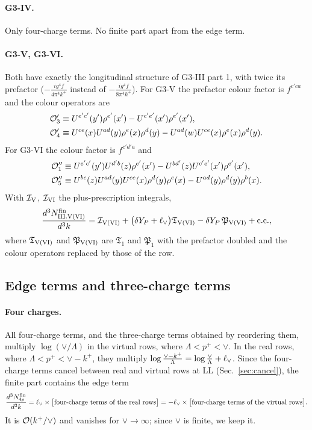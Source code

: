 \paragraph*{G3-IV.} Only four-charge terms. No finite part apart from the edge term.

\paragraph*{G3-V, G3-VI.} Both have exactly the longitudinal structure of G3-III part 1, with twice its prefactor ($-\frac{ig^4f}{4\pi^4k^+}$ instead of $-\frac{ig^4f}{8\pi^4k^+}$). For G3-V the prefactor colour factor is $f^{c'ca}$ and the colour operators are
\begin{align}
\mathcal{O}'_3\equiv{}& U^{e'c'}(y')\rho^{e'}(x')-U^{c'e'}(x')\rho^{e'}(x'),\notag\\
\mathcal{O}'_4\equiv{}& U^{ce}(x)U^{ad}(y)\rho^e(x)\rho^d(y)-U^{ad}(w)U^{ce}(x)\rho^e(x)\rho^d(y).
\end{align}
For G3-VI the colour factor is $f^{c'd'a}$ and
\begin{align}
\mathcal{O}''_1\equiv{}&U^{e'c'}(y')U^{d'b}(z)\rho^{e'}(x')-U^{bd'}(z)U^{c'e'}(x')\rho^{e'}(x'),\notag\\
\mathcal{O}''_5\equiv{}& U^{bc}(z)U^{ad}(y)U^{ce}(x)\rho^d(y)\rho^e(x)-U^{ad}(y)\rho^d(y)\rho^b(x).
\end{align}
With $\mathcal I_{\rm V}$, $\mathcal I_{\rm VI}$ the plus-prescription integrals,
\begin{equation}
\frac{d^3N^{\rm fin}_{\rm III.V(VI)}}{d^3k}=\mathcal I_{\rm V(VI)}+\big(\delta Y_P+\ell_{\vee}\big)\mathfrak T_{\rm V(VI)}-\delta Y_P\,\mathfrak P_{\rm V(VI)}+{\rm c.c.},
\end{equation}
where $\mathfrak T_{\rm V(VI)}$ and $\mathfrak P_{\rm V(VI)}$ are $\mathfrak T_1$ and $\mathfrak P_1$ with the prefactor doubled and the colour operators replaced by those of the row.

\subsection{Edge terms and three-charge terms}\label{sec:edge}

\paragraph*{Four charges.} All four-charge terms, and the three-charge terms obtained by reordering them, multiply $\log(\vee/\Lambda)$ in the virtual rows, where $\Lambda<p^+<\vee$. In the real rows, where $\Lambda<p^+<\vee-k^+$, they multiply $\log\frac{\vee-k^+}{\Lambda}=\log\frac{\vee}{\Lambda}+\ell_{\vee}$. Since the four-charge terms cancel between real and virtual rows at LL (Sec.~\ref{sec:cancel}), the finite part contains the edge term
\begin{equation}
\frac{d^3N^{\rm fin}_{4\rho}}{d^3k}=\ell_{\vee}\times\big[\text{four-charge terms of the real rows}\big]=-\ell_{\vee}\times\big[\text{four-charge terms of the virtual rows}\big].
\end{equation}
It is $\mathcal{O}(k^+/\vee)$ and vanishes for $\vee\to\infty$; since $\vee$ is finite, we keep it.

